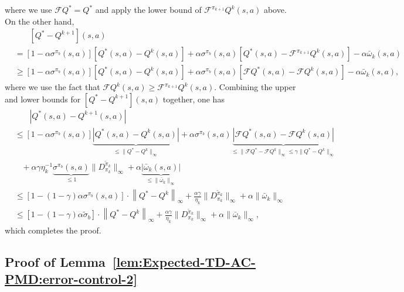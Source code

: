 \documentclass[10pt]{article}
\newcommand{\calF}{\mathcal{F}}
\newcommand{\ls}{\left}
\newcommand{\rs}{\right}
\theoremstyle{plain}
\theoremstyle{definition}
\begin{document}
    where we use $\calF Q^* = Q^*$ and apply the lower bound of $\calF^{\pi_{k+1}} Q^k(s,a)$ above. On the other hand,
    \begin{align*}
        &\phantom{=\,\,\,}[Q^* - Q^{k+1}](s,a) \\
        &= [1-\alpha\sigma^{\pi_b}(s,a)] [Q^*(s,a) - Q^k(s,a)] + \alpha\sigma^{\pi_b}(s,a) [Q^*(s,a) - \calF^{\pi_{k+1}} Q^k(s,a)] - \alpha \bar\omega_k(s,a) \\
        &\geq [1-\alpha\sigma^{\pi_b}(s,a)] [Q^*(s,a) - Q^k(s,a)] + \alpha\sigma^{\pi_b}(s,a) [\calF Q^*(s,a) - \calF Q^k(s,a)] - \alpha \bar\omega_k(s,a),
    \end{align*}
    where we use the fact that $\calF Q^k(s,a) \geq \calF^{\pi_{k+1}} Q^k(s,a)$. Combining the upper and lower bounds for $[Q^* - Q^{k+1}](s,a)$ together, one has
    \begin{align*}
        &\phantom{=\,\,\,}\ls| Q^*(s,a) - Q^{k+1}(s,a) \rs| \\
        & \leq [1-\alpha\sigma^{\pi_b}(s,a)] \underbrace{\ls| Q^*(s,a) - Q^k(s,a) \rs|}_{\leq \| Q^* - Q^k \|_\infty} + \alpha\sigma^{\pi_b}(s,a) \underbrace{\ls| \calF Q^*(s,a) - \calF Q^k(s,a) \rs|}_{\leq \| \calF Q^* - \calF Q^k \|_\infty \leq \gamma\| Q^* -Q^k \|_\infty} \\
        &\;\;\;+ \alpha\gamma\eta_k^{-1} \underbrace{\sigma^{\pi_b}(s,a)}_{\leq 1} \| D^{\tilde\pi_k}_{\pi_k} \|_\infty + \alpha \underbrace{|\bar\omega_k(s,a)|}_{\leq \| \bar\omega_k \|_\infty} \\
        &\leq [1-(1-\gamma)\alpha\sigma^{\pi_b}(s,a)] \cdot \ls\| Q^* - Q^k \rs\|_\infty + \frac{\alpha\gamma}{\eta_k} \| D^{\tilde\pi_k}_{\pi_k} \|_\infty + \alpha \| \bar\omega_k \|_\infty \\
        &\leq [1-(1-\gamma)\alpha\tilde\sigma_b] \cdot \ls\| Q^* - Q^k \rs\|_\infty + \frac{\alpha\gamma}{\eta_k} \| D^{\tilde\pi_k}_{\pi_k} \|_\infty + \alpha \| \bar\omega_k \|_\infty,
    \end{align*}
   which completes the proof.
\subsection{Proof of Lemma~\ref{lem:Expected-TD-AC-PMD:error-control-2}}\label{sec:proof-stochastic-error-2}
\end{document}
